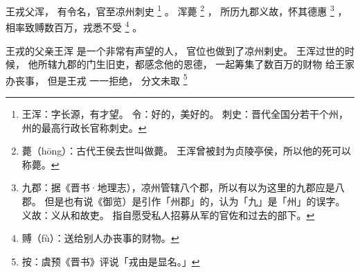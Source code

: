 
\switchcolumn*[\section{}]

王戎父浑，
有令名，官至凉州刺史%
\footnote{%
    王浑：字长源，有才望。
    令：好的，美好的。
    刺史：晋代全国分若干个州，州的最高行政长官称刺史。
}%
。
浑薨%
\footnote{%
    薨（hōng）：古代王侯去世叫做薨。
                王浑曾被封为贞陵亭侯，所以他的死可以称薨。
}%
，
所历九郡义故，怀其德惠%
\footnote{%
    九郡：据《晋书·地理志），凉州管辖八个郡，所以有以为这里的九郡应是八郡。
          但是也有说《御览）是引作「州郡」的，认为「九」是「州」的误字。
    义故：义从和故吏。
          指自愿受私人招募从军的官佐和过去的部下。
}%
，
相率致赙数百万，戎悉不受%
\footnote{%
    赙（fù）：送给别人办丧事的财物。
}%
。

\switchcolumn

王戎的父亲王浑
是一个非常有声望的人，
官位也做到了凉州剌史。
王浑过世的时候，
他所辖九郡的门生旧吏，都感念他的恩德，
一起筹集了数百万的财物
给王家办丧事，
但是王戎
一一拒绝，
分文未取%
\footnote{%
    按：虞预《晋书》评说「戎由是显名。」
}%

